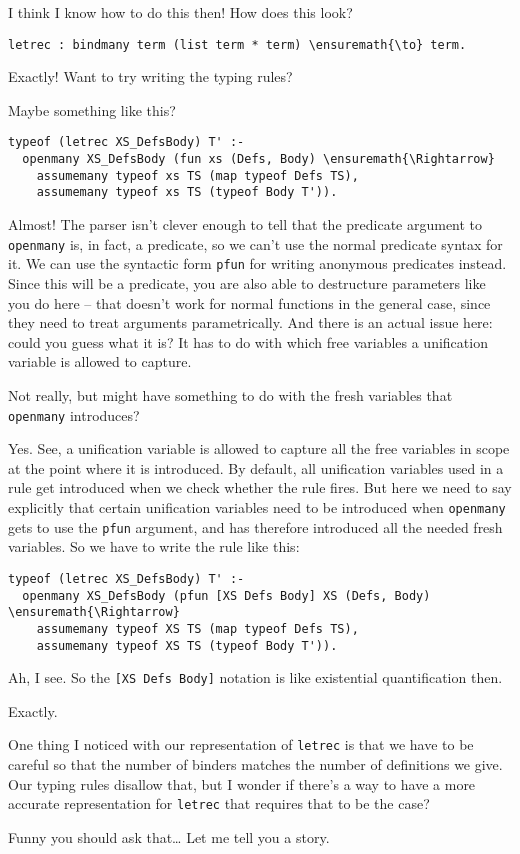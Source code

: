 \heroSTUDENT{} I think I know how to do this then! How does this look?

\begin{verbatim}
letrec : bindmany term (list term * term) \ensuremath{\to} term.
\end{verbatim}

\heroADVISOR{} Exactly! Want to try writing the typing rules?

\heroSTUDENT{} Maybe something like this?

\begin{verbatim}
typeof (letrec XS_DefsBody) T' :-
  openmany XS_DefsBody (fun xs (Defs, Body) \ensuremath{\Rightarrow}
    assumemany typeof xs TS (map typeof Defs TS),
    assumemany typeof xs TS (typeof Body T')).
\end{verbatim}

\heroADVISOR{} Almost! The parser isn't clever enough to tell that the
predicate argument to \texttt{openmany} is, in fact, a predicate, so we
can't use the normal predicate syntax for it. We can use the syntactic
form \texttt{pfun} for writing anonymous predicates instead. Since this
will be a predicate, you are also able to destructure parameters like
you do here -- that doesn't work for normal functions in the general
case, since they need to treat arguments parametrically. And there is an
actual issue here: could you guess what it is? It has to do with which
free variables a unification variable is allowed to capture.

\heroSTUDENT{} Not really, but might have something to do with the fresh
variables that \texttt{openmany} introduces?

\heroADVISOR{} Yes. See, a unification variable is allowed to capture all the
free variables in scope at the point where it is introduced. By default,
all unification variables used in a rule get introduced when we check
whether the rule fires. But here we need to say explicitly that certain
unification variables need to be introduced when \texttt{openmany} gets
to use the \texttt{pfun} argument, and has therefore introduced all the
needed fresh variables. So we have to write the rule like this:

\begin{verbatim}
typeof (letrec XS_DefsBody) T' :-
  openmany XS_DefsBody (pfun [XS Defs Body] XS (Defs, Body) \ensuremath{\Rightarrow}
    assumemany typeof XS TS (map typeof Defs TS),
    assumemany typeof XS TS (typeof Body T')).
\end{verbatim}

\heroSTUDENT{} Ah, I see. So the \texttt{{[}XS\ Defs\ Body{]}} notation is
like existential quantification then.

\heroADVISOR{} Exactly.

\heroSTUDENT{} One thing I noticed with our representation of \texttt{letrec}
is that we have to be careful so that the number of binders matches the
number of definitions we give. Our typing rules disallow that, but I
wonder if there's a way to have a more accurate representation for
\texttt{letrec} that requires that to be the case?

\heroADVISOR{} Funny you should ask that\ldots{} Let me tell you a story.

